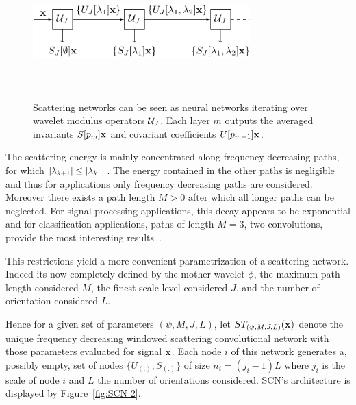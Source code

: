 \documentclass{article}
\begin{document}
    \begin{figure}
      \begin{center}
        \includegraphics[width=3.3in, height=2in, keepaspectratio]{scatnet_crop.pdf}
        \caption[Scattering convolution network.]{\centering  Scattering networks can be seen as neural networks iterating over wavelet  modulus  operators $\mathcal{U}_{J}$. Each layer $m$ outputs the averaged  invariants $S[p_{m}]{\bf x}$ and covariant coefficients $U[p_{m+1}]{\bf x}$.}
        \label{fig:SCN 1}
      \end{center}
      \vspace{-15pt}
    \end{figure}
    
    The scattering energy is mainly concentrated along frequency decreasing paths, \ie for which $\left| \lambda_{k+1} \right| \leq \left| \lambda_{k} \right|$~\cite{mallat2012gis}. The energy contained in the other paths is negligible and thus for applications only frequency decreasing paths are considered. Moreover there exists a path length $M > 0$ after which all longer paths can be neglected. For signal processing applications, this decay appears to be exponential and for classification applications, paths of length $M = 3$, \ie two convolutions, provide the most interesting results~\cite{anden2011multiscale, bruna2010classification}.
      
    This restrictions yield a more convenient parametrization of a scattering network. Indeed its now completely defined by the mother wavelet $\phi$, the maximum path length considered $M$, the finest scale level considered $J$, and the number of orientation considered $L$.
      
    Hence for a given set of parameters $(\psi, M,J,L)$, let $ST_{(\psi,M,J,L)}({\bf x})$ denote the unique frequency decreasing windowed scattering convolutional network with those parameters evaluated for signal ${\bf x}$. Each node $i$ of this network generates a, possibly empty, set of nodes $\{U_{(.)}, S_{(.)}\}$ of size $n_{i} = (j_{i}-1)L$ where $j_{i}$ is the scale of node $i$ and $L$ the number of orientations considered. SCN's architecture is displayed by Figure~\ref{fig:SCN 2}.
\end{document}
